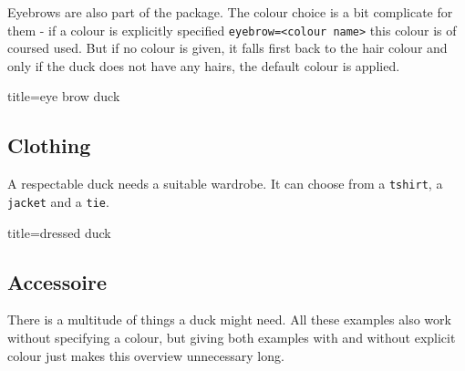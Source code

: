 \documentclass{ltxdockit}
\begin{document}
Eyebrows are also part of the package. The colour choice is a bit complicate for them - if a colour is explicitly specified \verb|eyebrow=<colour name>| this colour is of coursed used. But if no colour is given, it falls first back to the hair colour and only if the duck does not have any hairs, the default colour is applied.
\begin{tcblisting}{title={eye brow duck}}
\begin{tikzpicture}
	\duck[eyebrow]
\end{tikzpicture}
\begin{tikzpicture}
	\duck[longhair=blue, 
		eyebrow]
\end{tikzpicture}

\begin{tikzpicture}
	\duck[crazyhair=red, 
		eyebrow=blue]
\end{tikzpicture}
\end{tcblisting}

\newpage
\subsection{Clothing}

A respectable duck needs a suitable wardrobe. It can choose from a \texttt{tshirt}, a \texttt{jacket} and a \texttt{tie}.
\begin{tcblisting}{title={dressed duck}}
\begin{tikzpicture}
	\duck[tshirt]
\end{tikzpicture}
\begin{tikzpicture}
	\duck[jacket]
\end{tikzpicture}

\begin{tikzpicture}
	\duck[tie]
\end{tikzpicture}
\begin{tikzpicture}
	\duck[tshirt=lightgray, 
			jacket=blue!50!black, 
			tie=blue!80!black, 
			shorthair]
\end{tikzpicture}
\end{tcblisting}

\subsection{Accessoire}

There is a multitude of things a duck might need. All these examples also work without specifying a colour, but giving both examples with and without explicit colour just makes this overview unnecessary long.
\end{document}
